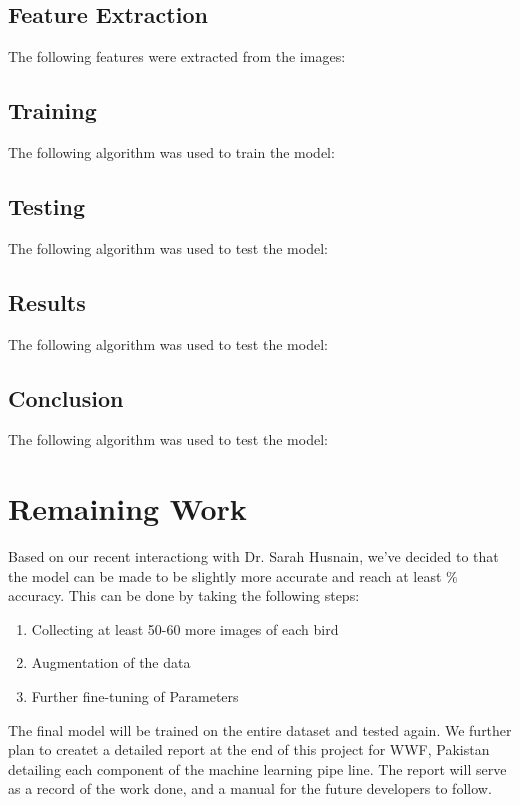 \documentclass{article}
\begin{document}
    \subsection*{Feature Extraction}
    The following features were extracted from the images:

    \subsection*{Training}
    The following algorithm was used to train the model:
    

    \subsection*{Testing}
    The following algorithm was used to test the model:
    
    \subsection*{Results}
    The following algorithm was used to test the model:
    
    \subsection*{Conclusion}
    The following algorithm was used to test the model:


    \section*{Remaining Work}
    
    Based on our recent interactiong with Dr. Sarah Husnain, we've decided to that the model can be made to be slightly more accurate and reach at least $\%$ accuracy. This can be done by taking the following steps:
    \begin{enumerate}
        \item Collecting at least 50-60 more images of each bird
        \item Augmentation of the data
        \item Further fine-tuning of Parameters
    \end{enumerate}
    The final model will be trained on the entire dataset and tested again. We further plan to createt a detailed report at the end of this project for WWF, Pakistan detailing each component of the machine learning pipe line. The report will serve as a record of the work done, and a manual for the future developers to follow.
    
\end{document}
